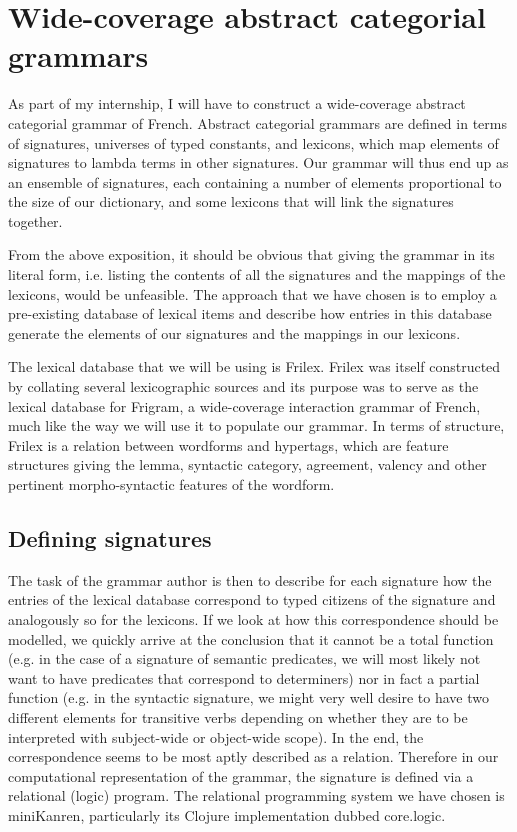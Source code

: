 \section{Wide-coverage abstract categorial grammars}

As part of my internship, I will have to construct a wide-coverage
abstract categorial grammar of French. Abstract categorial grammars
are defined in terms of signatures, universes of typed constants, and
lexicons, which map elements of signatures to lambda terms in other
signatures. Our grammar will thus end up as an ensemble of signatures,
each containing a number of elements proportional to the size of our
dictionary, and some lexicons that will link the signatures together.

From the above exposition, it should be obvious that giving the
grammar in its literal form, i.e. listing the contents of all the
signatures and the mappings of the lexicons, would be unfeasible. The
approach that we have chosen is to employ a pre-existing database of
lexical items and describe how entries in this database generate the
elements of our signatures and the mappings in our lexicons.

The lexical database that we will be using is Frilex. Frilex was
itself constructed by collating several lexicographic sources and its
purpose was to serve as the lexical database for Frigram, a
wide-coverage interaction grammar of French, much like the way we will
use it to populate our grammar. In terms of structure, Frilex is a
relation between wordforms and hypertags, which are feature structures
giving the lemma, syntactic category, agreement, valency and other
pertinent morpho-syntactic features of the wordform.

\subsection{Defining signatures}

The task of the grammar author is then to describe for each signature
how the entries of the lexical database correspond to typed citizens
of the signature and analogously so for the lexicons. If we look at
how this correspondence should be modelled, we quickly arrive at the
conclusion that it cannot be a total function (e.g. in the case of a
signature of semantic predicates, we will most likely not want to have
predicates that correspond to determiners) nor in fact a partial
function (e.g. in the syntactic signature, we might very well desire
to have two different elements for transitive verbs depending on
whether they are to be interpreted with subject-wide or object-wide
scope). In the end, the correspondence seems to be most aptly
described as a relation. Therefore in our computational representation
of the grammar, the signature is defined via a relational (logic)
program. The relational programming system we have chosen is
miniKanren, particularly its Clojure implementation dubbed core.logic.

